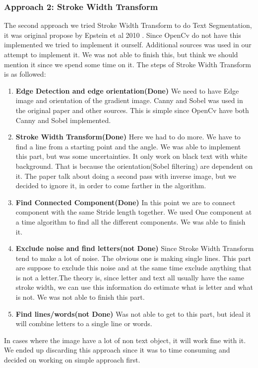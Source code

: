\documentclass[Report.tex]{subfiles}
\begin{document}
\begin{flushleft}
  \subsubsection{Approach 2: Stroke Width Transform}
  The second approach we tried Stroke Width Transform to do Text Segmentation, it was original propose by Epstein et al 2010 \cite{epshtein_stroke_2010}. Since OpenCv do not have this implemented we tried to implement it ourself. Additional sources was used in our attempt to implement it\cite{werner_text_????, _c++_????, bunn_strokewidthtransform:_2018}. We was not able to finish this, but think we should mention it since we spend some time on it. The steps of Stroke Width Transform is as followed:
  \begin{enumerate}
    \item \textbf{Edge Detection and edge orientation(Done)}
    We need to have Edge image and orientation of the gradient image.
    Canny and Sobel was used in the original paper and other sources. This is simple since OpenCv have both Canny and Sobel implemented.
    \item \textbf{Stroke Width Transform(Done)}
    Here we had to do more. We have to find a line from a starting point and the angle. We was able to implement this part, but was some uncertainties. It only work on black text with white background. That is because the orientation(Sobel filtering) are dependent on it. The paper talk about doing a second pass with inverse image, but we decided to ignore it, in order to come farther in the algorithm.
    \item \textbf{Find Connected Component(Done)}
    In this point we are to connect component with the same Stride length together. We used One component at a time algorithm to find all the different components. We was able to finish it.
    \item \textbf{Exclude noise and find letters(not Done)}
    Since Stroke Width Transform tend to make a lot of noise. The obvious one is making single lines. This part are suppose to exclude this noise and at the same time exclude anything that is not a letter.The theory is, since letter and text all usually have the same stroke width, we can use this information do estimate what is letter and what is not. We was not able to finish this part.
    \item \textbf{Find lines/words(not Done)}
    Was not able to get to this part, but ideal it will combine letters to a single line or words.
  \end{enumerate}
  In cases where the image have a lot of non text object, it will work fine with it. We ended up discarding this approach since it was to time consuming and decided on working on simple approach first.
\end{flushleft}
\end{document}
